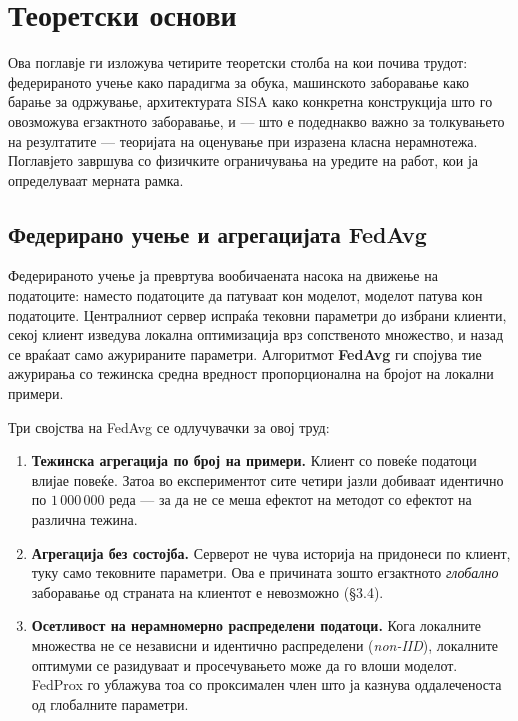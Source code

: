 \chapter{Теоретски основи}
\label{chap:theory}

Ова поглавје ги изложува четирите теоретски столба на кои почива трудот: федерираното
учење како парадигма за обука, машинското заборавање како барање за одржување,
архитектурата SISA како конкретна конструкција што го овозможува егзактното заборавање, и --- што е подеднакво важно за толкувањето на резултатите --- теоријата на оценување при
изразена класна нерамнотежа. Поглавјето завршува со физичките ограничувања на уредите на
работ, кои ја определуваат мерната рамка.

\section{Федерирано учење и агрегацијата FedAvg}

Федерираното учење \cite{mcmahan2017fedavg} ја превртува вообичаената насока на движење на
податоците: наместо податоците да патуваат кон моделот, моделот патува кон податоците.
Централниот сервер испраќа тековни параметри до избрани клиенти, секој клиент изведува
локална оптимизација врз сопственото множество, и назад се враќаат само ажурираните
параметри. Алгоритмот \textbf{FedAvg} ги спојува тие ажурирања со тежинска средна вредност
пропорционална на бројот на локални примери.

Три својства на FedAvg се одлучувачки за овој труд:

\begin{enumerate}
  \item \textbf{Тежинска агрегација по број на примери.} Клиент со повеќе податоци влијае повеќе. Затоа во експериментот сите четири јазли добиваат идентично по $1\,000\,000$ реда --- за да не се меша ефектот на методот со ефектот на различна тежина.
  \item \textbf{Агрегација без состојба.} Серверот не чува историја на придонеси по клиент, туку само тековните параметри. Ова е причината зошто егзактното \emph{глобално} заборавање од страната на клиентот е невозможно (§3.4).
  \item \textbf{Осетливост на нерамномерно распределени податоци.} Кога локалните множества не се независни и идентично распределени (\emph{non-IID}), локалните оптимуми се разидуваат и просечувањето може да го влоши моделот. FedProx \cite{li2020fedprox} го ублажува тоа со проксимален член што ја казнува оддалеченоста од глобалните параметри.
\end{enumerate}

